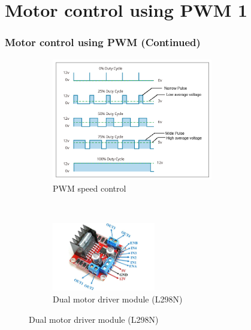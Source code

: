 \documentclass{beamer}
\begin{document}
\section{Motor control using PWM 1}
\begin{frame}
\frametitle{Motor control using PWM \small{(Continued)}}
\begin{figure}[t!]
    \centering
    \begin{subfigure}[t]{0.5\textwidth}
        \centering
        \includegraphics[width = 7cm]{./figs/PWM_speed_control.png}
        \caption{PWM speed control}
    \end{subfigure}%
    ~ 
    \begin{subfigure}[t]{0.5\textwidth}
        \centering
        \includegraphics[width = 4.5cm]{./figs/Motor_driver_L298.jpg}
        \caption{Dual motor driver module (L298N)}
    \end{subfigure}

\end{figure} 	
\end{frame}
\end{document}
